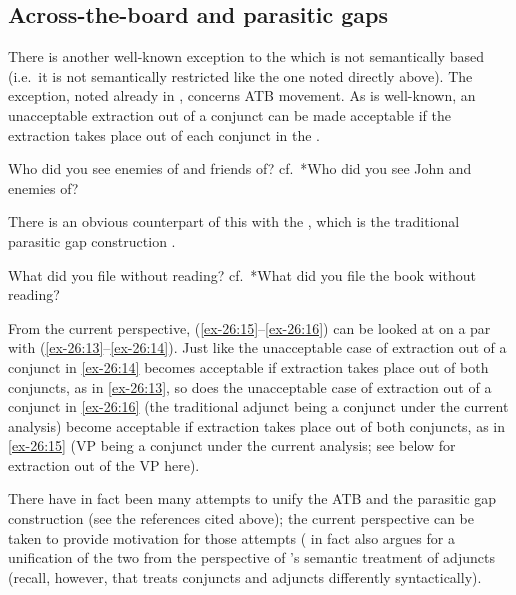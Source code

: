 \documentclass[output=paper]{langsci/langscibook}
\begin{document}
\subsection{Across-the-board  and parasitic gaps}

There is another well-known exception to the  which is not
semantically based (i.e.\ it is not semantically restricted like the one noted
directly above). The exception, noted already in \citet{Ross1967}, concerns
\gls{ATB} movement. As is well-known, an
unacceptable extraction out of a conjunct can be made acceptable if the
extraction takes place out of each conjunct in the
.

\ea\label{ex-26:13} Who did you see enemies of and friends of?
\ex\label{ex-26:14} cf.\ *Who did you see John and enemies of?
\z

There is an obvious counterpart of this with the , which is the traditional
parasitic gap construction \parencite[see
also][]{Haik1985,HuyvanRiem1985,Williams1990,Franks1993,Progovac1998,Nunes2004}.

\ea\label{ex-26:15} What did you file without reading?
\ex\label{ex-26:16} cf.\ *What did you file the book without reading?
\z

From the current perspective, (\ref{ex-26:15}--\ref{ex-26:16}) can be looked at on a par with
(\ref{ex-26:13}--\ref{ex-26:14}). Just like the unacceptable case of extraction out of a conjunct in
\eqref{ex-26:14} becomes acceptable if extraction takes place out of both conjuncts, as in
\eqref{ex-26:13}, so does the unacceptable case of extraction out of a conjunct in \eqref{ex-26:16}
(the traditional adjunct being a conjunct under the current analysis) become
acceptable if extraction takes place out of both conjuncts, as in \eqref{ex-26:15} (VP
being a conjunct under the current analysis; see below for extraction out of
the VP here).

There have in fact been many attempts to unify the
\gls{ATB} and the parasitic
gap construction (see the references cited above); the current perspective can
be taken to provide motivation for those attempts (\citealt{Takahashi1994} in
fact also argues for a unification of the two from the perspective of
\citeauthor{Higginbotham1985}’s semantic treatment of adjuncts
(recall, however, that \citeauthor{Takahashi1994} treats conjuncts and adjuncts
differently syntactically).
\end{document}
